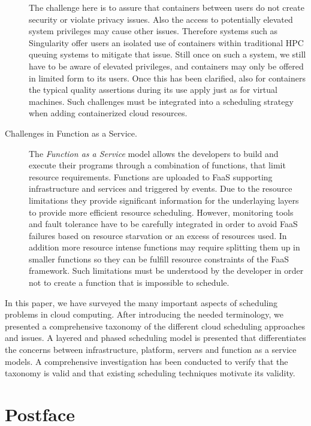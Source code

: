 \documentclass[final,5p,times,twocolumn]{elsarticle}
\begin{document}
\begin{description}
The challenge here is to assure that containers between users do not
create security or violate privacy issues. Also the access to
potentially elevated system privileges may cause other issues.
Therefore systems such as Singularity offer users an isolated use of
containers within traditional HPC queuing systems to mitigate that
issue. Still once on such a system, we still have to be aware of
elevated privileges, and containers may only be offered in limited
form to its users. Once this has been clarified, also for containers
the typical quality assertions during its use apply just as for
virtual machines. Such challenges must be integrated into a scheduling
strategy when adding containerized cloud resources.


\item[Challenges in Function as a Service.] The {\em Function as a
    Service} model allows the developers to build and execute their
  programs through a combination of functions, that limit resource
  requirements. Functions are uploaded to FaaS supporting
  infrastructure and services and triggered by events. Due to the
  resource limitations they provide significant information for the
  underlaying layers to provide more efficient resource scheduling.
  However, monitoring tools and fault tolerance have to be carefully
  integrated in order to avoid FaaS failures based on resource
  starvation or an excess of resources used. In addition more resource
  intense functions may require splitting them up in smaller functions
  so they can be fulfill resource constraints of the FaaS framework.
  Such limitations must be understood by the developer in order not to
  create a function that is impossible to schedule.

\end{description}

\color{black}

In this paper, we have surveyed the many important aspects of
scheduling problems in cloud computing. After introducing the needed
terminology, we presented a comprehensive taxonomy of the different
cloud scheduling approaches and issues. A layered and phased
scheduling model is presented that differentiates the concerns between
infrastructure, platform, servers and function as a service models. A
comprehensive investigation has been conducted to verify that the
taxonomy is valid and that existing scheduling techniques motivate its
validity.



\section*{Postface}
\end{document}

